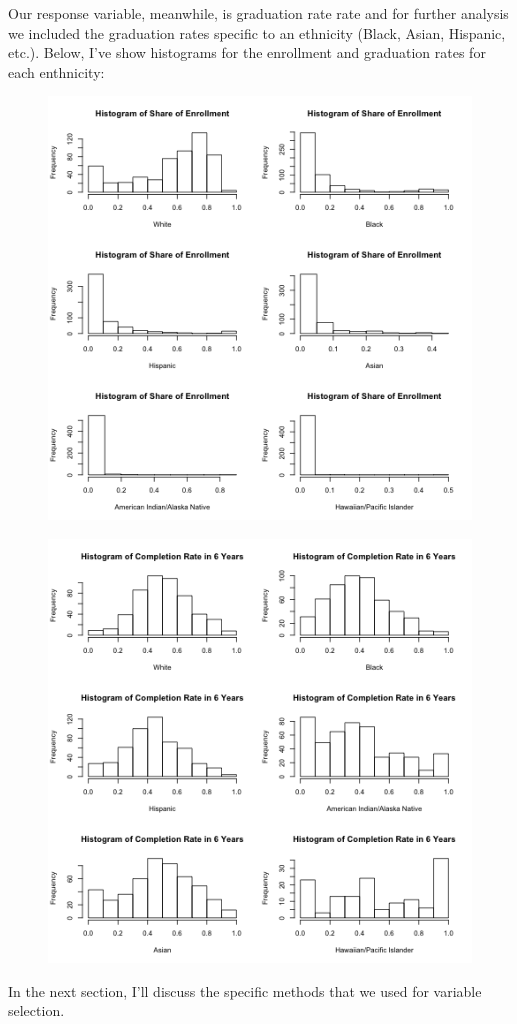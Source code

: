 \documentclass{article}
\begin{document}
Our response variable, meanwhile, is graduation rate rate and for further analysis we included the graduation rates specific to an ethnicity (Black, Asian, Hispanic, etc.). Below, I've show histograms for the enrollment and graduation rates for each enthnicity:

\begin{figure}[!htb]
\includegraphics{../../images/histogram_race_enrollment.png}
\end{figure}

\begin{figure}[!htb]
\includegraphics{../../images/histogram_race_completion.png}
\end{figure}

In the next section, I'll discuss the specific methods that we used for variable selection.
\end{document}
